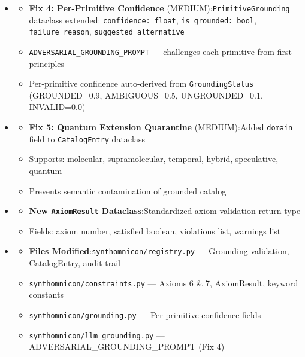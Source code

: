 \documentclass[12pt,a4paper]{article}
\begin{document}
\begin{itemize}
\begin{itemize}
    \item 
    \begin{itemize}
    \item \textbf{Fix 4: Per-Primitive Confidence} (MEDIUM):\texttt{PrimitiveGrounding} dataclass extended: \texttt{confidence: float}, \texttt{is\_grounded: bool}, \texttt{failure\_reason}, \texttt{suggested\_alternative}
    \item \texttt{ADVERSARIAL\_GROUNDING\_PROMPT} --- challenges each primitive from first principles
    \item Per-primitive confidence auto-derived from \texttt{GroundingStatus} (GROUNDED=0.9, AMBIGUOUS=0.5, UNGROUNDED=0.1, INVALID=0.0)
\end{itemize}

    \item 
    \begin{itemize}
    \item \textbf{Fix 5: Quantum Extension Quarantine} (MEDIUM):Added \texttt{domain} field to \texttt{CatalogEntry} dataclass
    \item Supports: molecular, supramolecular, temporal, hybrid, speculative, quantum
    \item Prevents semantic contamination of grounded catalog
\end{itemize}

    \item 
    \begin{itemize}
    \item \textbf{New \texttt{AxiomResult} Dataclass}:Standardized axiom validation return type
    \item Fields: axiom number, satisfied boolean, violations list, warnings list
\end{itemize}

    \item 
    \begin{itemize}
    \item \textbf{Files Modified}:\texttt{synthomnicon/registry.py} --- Grounding validation, CatalogEntry, audit trail
    \item \texttt{synthomnicon/constraints.py} --- Axioms 6 \& 7, AxiomResult, keyword constants
    \item \texttt{synthomnicon/grounding.py} --- Per-primitive confidence fields
    \item \texttt{synthomnicon/llm\_grounding.py} --- ADVERSARIAL\_GROUNDING\_PROMPT (Fix 4)
\end{itemize}


\end{itemize}
\end{itemize}
\end{document}
